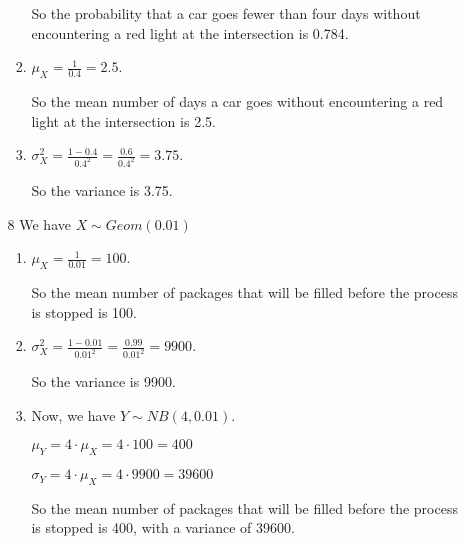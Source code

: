 \documentclass[12pt,letterpaper]{article}
\begin{document}
\begin{enumerate}
\begin{enumerate}
\begin{enumerate}[label=(\arabic*)]
              So the probability that a car goes fewer than four days without encountering a red light at the intersection is 0.784.
            \item
              $\mu_X = \frac{1}{0.4} = 2.5$.

              So the mean number of days a car goes without encountering a red light at the intersection is 2.5.
            \item
              $\sigma_X^2 = \frac{1 - 0.4}{0.4^2} = \frac{0.6}{0.4^2} = 3.75$.

              So the variance is 3.75.
          \end{enumerate}
        \item [8]
          We have $X \sim Geom(0.01)$
          \begin{enumerate}[label=(\arabic*)]
            \item
              $\mu_X = \frac{1}{0.01} = 100$.

              So the mean number of packages that will be filled before the process is stopped is 100.
            \item
              $\sigma_X^2 = \frac{1 - 0.01}{0.01^2} = \frac{0.99}{0.01^2} = 9900$.

              So the variance is 9900.
            \item
              Now, we have $Y \sim NB(4, 0.01)$.

              $\mu_Y = 4 \cdot \mu_X = 4 \cdot 100 = 400$

              $\sigma_Y = 4 \cdot \mu_X = 4 \cdot 9900 = 39600$

              So the mean number of packages that will be filled before the process is stopped is 400,
              with a variance of 39600.
          \end{enumerate}
      \end{enumerate}
  \end{enumerate}
\end{document}
